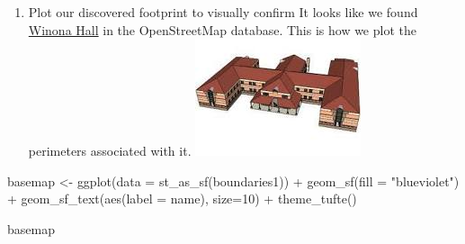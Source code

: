 \documentclass[
  paper=a4,
  ,captions=tableheading
]{scrartcl}
\newenvironment{Shaded}{\begin{snugshade}}{\end{snugshade}}
\newcommand{\AttributeTok}[1]{\textcolor[rgb]{0.77,0.63,0.00}{#1}}
\newcommand{\DecValTok}[1]{\textcolor[rgb]{0.00,0.00,0.81}{#1}}
\newcommand{\FunctionTok}[1]{\textcolor[rgb]{0.00,0.00,0.00}{#1}}
\newcommand{\NormalTok}[1]{#1}
\newcommand{\OtherTok}[1]{\textcolor[rgb]{0.56,0.35,0.01}{#1}}
\newcommand{\SpecialCharTok}[1]{\textcolor[rgb]{0.00,0.00,0.00}{#1}}
\newcommand{\StringTok}[1]{\textcolor[rgb]{0.31,0.60,0.02}{#1}}
\providecommand{\tightlist}{%
  \setlength{\itemsep}{0pt}\setlength{\parskip}{0pt}}
\begin{document}

\begin{enumerate}
\def\labelenumi{\arabic{enumi}.}
\setcounter{enumi}{3}
\tightlist
\item
  Plot our discovered footprint to visually confirm It looks like we
  found \href{https://www.kansasmemory.org/item/449914}{Winona Hall} in
  the OpenStreetMap database. This is how we plot the perimeters
  associated with it. \includegraphics{winona hall haskell.png}
\end{enumerate}

\begin{Shaded}
\begin{Highlighting}[]
\NormalTok{basemap }\OtherTok{\textless{}{-}} \FunctionTok{ggplot}\NormalTok{(}\AttributeTok{data =} \FunctionTok{st\_as\_sf}\NormalTok{(boundaries1)) }\SpecialCharTok{+}
  \FunctionTok{geom\_sf}\NormalTok{(}\AttributeTok{fill =} \StringTok{"blueviolet"}\NormalTok{) }\SpecialCharTok{+}
  \FunctionTok{geom\_sf\_text}\NormalTok{(}\FunctionTok{aes}\NormalTok{(}\AttributeTok{label =}\NormalTok{ name), }\AttributeTok{size=}\DecValTok{10}\NormalTok{) }\SpecialCharTok{+}
  \FunctionTok{theme\_tufte}\NormalTok{()}

\NormalTok{basemap}
\end{Highlighting}
\end{Shaded}
\end{document}
